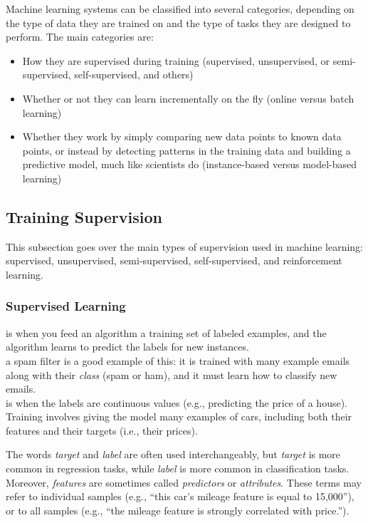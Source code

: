 Machine learning systems can be classified into several categories, depending on the type of data they are trained on and the type of tasks they are designed to perform. The main categories are:
\begin{itemize}
    \item How they are supervised during training (supervised, unsupervised, or semi-supervised, self-supervised, and others)
    \item Whether or not they can learn incrementally on the fly (online versus batch learning)
    \item Whether they work by simply comparing new data points to known data points, or instead by detecting patterns in the training data and building a predictive model, much like scientists do (instance-based versus model-based learning)
\end{itemize}

\subsection{Training Supervision}
\label{subsec:training_supervision}

This subsection goes over the main types of supervision used in machine learning: supervised, unsupervised, semi-supervised, self-supervised, and reinforcement learning. 

\subsubsection{Supervised Learning}
\label{subsubsec:supervised_learning}

 is when you feed an algorithm a training set of labeled examples, and the algorithm learns to predict the labels for new instances. \\

 a spam filter is a good example of this: it is trained with many example emails along with their \textit{class} (spam or ham), and it must learn how to classify new emails. \\

 is when the labels are continuous values (e.g., predicting the price of a house). Training involves giving the model many examples of cars, including both their features and their targets (i.e., their prices).
\newpage
\begin{notebox}
    The words \textit{target} and \textit{label}  are often used interchangeably, but \textit{target} is more common in regression tasks, while \textit{label} is more common in classification tasks. Moreover, \textit{features} are sometimes called \textit{predictors} or \textit{attributes}. These terms may refer to individual samples (e.g., ``this car's mileage feature is equal to 15,000''), or to all samples (e.g., ``the mileage feature is strongly correlated with price.'').
\end{notebox}

